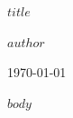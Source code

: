 \documentclass[a4paper]{article}
\begin{document}
\begin{titlepage}
    \centering
    \vspace*{2cm}
    {\Huge\bfseries $title$\par}
    \vspace{1cm}
    {\Large $author$\par}
    \vfill
    {\large \today\par}
\end{titlepage}

\tableofcontents
\newpage

$body$
\end{document}
